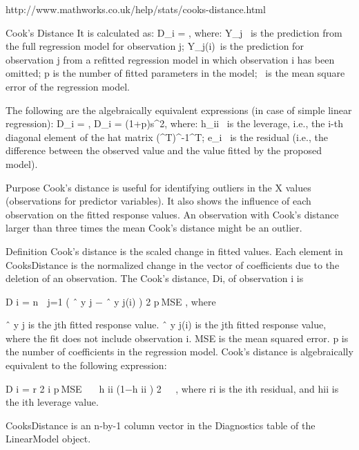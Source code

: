 http://www.mathworks.co.uk/help/stats/cooks-distance.html

Cook's Distance
It is calculated as:
D_i = ,
where:
\hat Y_j \, is the prediction from the full regression model for observation j;
\hat Y_{j(i)}\, is the prediction for observation j from a refitted regression model in which observation i has been omitted;
p is the number of fitted parameters in the model;
  \, is the mean square error of the regression model.

The following are the algebraically equivalent expressions (in case of simple linear regression):
D_i = ,
D_i =  {(1+p)s^2},
where:
h_{ii} \, is the leverage, i.e., the i-th diagonal element of the hat matrix \left(^T\right)^{-1}^T;
e_i \, is the residual (i.e., the difference between the observed value and the value fitted by the proposed model).



Purpose
Cook's distance is useful for identifying outliers in the X values (observations for predictor variables). It also shows the influence of each observation on the fitted response values. An observation with Cook's distance larger than three times the mean Cook's distance might be an outlier.

Definition
Cook's distance is the scaled change in fitted values. Each element in CooksDistance is the normalized change in the vector of coefficients due to the deletion of an observation. The Cook's distance, Di, of observation i is

D
i
=
n

j=1
(
ˆ
y
j
−
ˆ
y
j(i)
)
2
p MSE
,
where

ˆ
y
j
 is the jth fitted response value.
ˆ
y
j(i)
 is the jth fitted response value, where the fit does not include observation i.
MSE is the mean squared error.
p is the number of coefficients in the regression model.
Cook's distance is algebraically equivalent to the following expression:

D
i
=
r
2
i
p MSE

h
ii
(1−h
ii
)
2
,
where ri is the ith residual, and hii is the ith leverage value.

CooksDistance is an n-by-1 column vector in the Diagnostics table of the LinearModel object.

